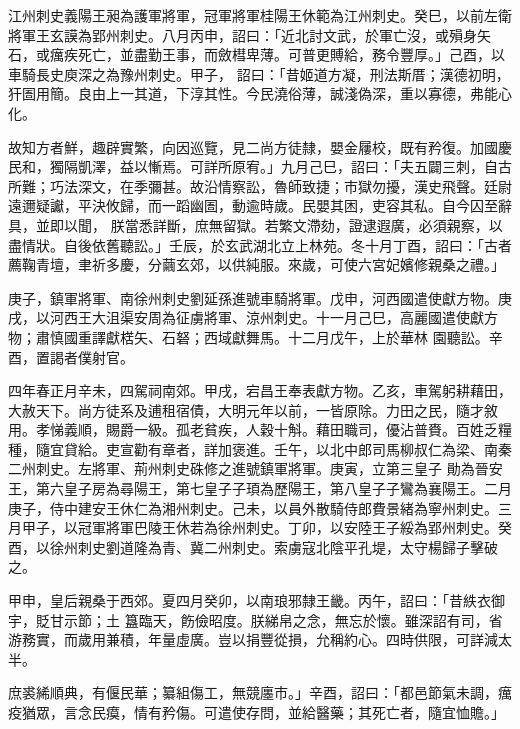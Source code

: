 \begin{pinyinscope}
 江州刺史義陽王昶為護軍將軍，冠軍將軍桂陽王休範為江州刺史。癸巳，以前左衛將軍王玄謨為郢州刺史。八月丙申，詔曰：「近北討文武，於軍亡沒，或殞身矢石，或癘疾死亡，並盡勤王事，而斂槥卑薄。可普更賻給，務令豐厚。」己酉，以車騎長史庾深之為豫州刺史。甲子，
 詔曰：「昔姬道方凝，刑法斯厝；漢德初明，犴圄用簡。良由上一其道，下淳其性。今民澆俗薄，誠淺偽深，重以寡德，弗能心化。



 故知方者鮮，趣辟實繁，向因巡覽，見二尚方徒隸，嬰金屨校，既有矜復。加國慶民和，獨隔凱澤，益以慚焉。可詳所原宥。」九月己巳，詔曰：「夫五闢三刺，自古所難；巧法深文，在季彌甚。故沿情察訟，魯師致捷；市獄勿擾，漢史飛聲。廷尉遠邇疑讞，平決攸歸，而一蹈幽圄，動逾時歲。民嬰其困，吏容其私。自今囚至辭具，並即以聞，
 朕當悉詳斷，庶無留獄。若繁文滯劾，證逮遐廣，必須親察，以盡情狀。自後依舊聽訟。」壬辰，於玄武湖北立上林苑。冬十月丁酉，詔曰：「古者薦鞠青壇，聿祈多慶，分繭玄郊，以供純服。來歲，可使六宮妃嬪修親桑之禮。」



 庚子，鎮軍將軍、南徐州刺史劉延孫進號車騎將軍。戊申，河西國遣使獻方物。庚戌，以河西王大沮渠安周為征虜將軍、涼州刺史。十一月己巳，高麗國遣使獻方物；肅慎國重譯獻楛矢、石砮；西域獻舞馬。十二月戊午，上於華林
 園聽訟。辛酉，置謁者僕射官。



 四年春正月辛未，四駕祠南郊。甲戌，宕昌王奉表獻方物。乙亥，車駕躬耕藉田，大赦天下。尚方徒系及逋租宿債，大明元年以前，一皆原除。力田之民，隨才敘用。孝悌義順，賜爵一級。孤老貧疾，人穀十斛。藉田職司，優沾普賚。百姓乏糧種，隨宜貸給。吏宣勸有章者，詳加褒進。壬午，以北中郎司馬柳叔仁為梁、南秦二州刺史。左將軍、荊州刺史硃修之進號鎮軍將軍。庚寅，立第三皇子
 勛為晉安王，第六皇子房為尋陽王，第七皇子子頊為歷陽王，第八皇子子鸞為襄陽王。二月庚子，侍中建安王休仁為湘州刺史。己未，以員外散騎侍郎費景緒為寧州刺史。三月甲子，以冠軍將軍巴陵王休若為徐州刺史。丁卯，以安陸王子綏為郢州刺史。癸酉，以徐州刺史劉道隆為青、冀二州刺史。索虜寇北陰平孔堤，太守楊歸子擊破之。



 甲申，皇后親桑于西郊。夏四月癸卯，以南琅邪隸王畿。丙午，詔曰：「昔紩衣御宇，貶甘示節；土
 簋臨天，飭儉昭度。朕綈帛之念，無忘於懷。雖深詔有司，省游務實，而歲用兼積，年量虛廣。豈以捐豐從損，允稱約心。四時供限，可詳減太半。



 庶裘絺順典，有偃民華；纂組傷工，無競廛市。」辛酉，詔曰：「都邑節氣未調，癘疫猶眾，言念民瘼，情有矜傷。可遣使存問，並給醫藥；其死亡者，隨宜恤贍。」




\end{pinyinscope}
